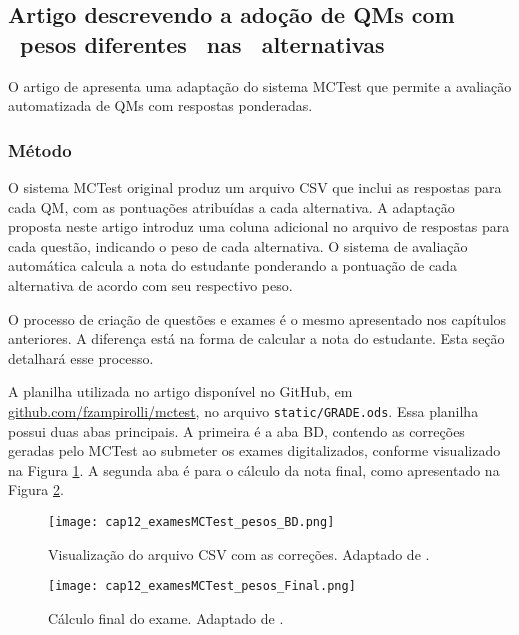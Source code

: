 \subsection{Artigo descrevendo a adoção de QMs com \ pesos diferentes \ nas \ alterna\-tivas}

O artigo de  apresenta uma adaptação do sistema MCTest que permite a avaliação automatizada de QMs com respostas ponderadas. 

\subsubsection{Método}

O sistema MCTest original produz um arquivo CSV que inclui as respostas para cada QM, com as pontuações atribuídas a cada alternativa. A adaptação proposta neste artigo introduz uma coluna adicional no arquivo de respostas para cada questão, indicando o peso de cada alternativa. O sistema de avaliação automática calcula a nota do estudante ponderando a pontuação de cada alternativa de acordo com seu respectivo peso.

O processo de criação de questões e exames é o mesmo apresentado nos capítulos anteriores. A diferença está na forma de calcular a nota do estudante. Esta seção detalhará esse processo.

A planilha utilizada no artigo disponível no GitHub, em \href{https://github.com/fzampirolli/mctest}{github.com/fzampirolli/mctest}, no arquivo \verb|static/GRADE.ods|.
%
Essa planilha possui duas abas principais. A primeira é a aba BD, contendo as correções geradas pelo MCTest ao submeter os exames digitalizados, conforme visualizado na Figura \ref{fig:cap12_examesMCTest_pesos_BD}. A segunda aba é para o cálculo da nota final, como apresentado na Figura \ref{fig:cap12_examesMCTest_pesos_Final}.

\begin{figure}[!ht]
\centering
  \texttt{[image: cap12\_examesMCTest\_pesos\_BD.png]}
  \caption{Visualização do arquivo CSV com as correções. Adaptado de .}
  \label{fig:cap12_examesMCTest_pesos_BD}
\end{figure}

\begin{figure}[!ht]
\centering
  \texttt{[image: cap12\_examesMCTest\_pesos\_Final.png]}
  \caption{Cálculo final do exame. Adaptado de .}
  \label{fig:cap12_examesMCTest_pesos_Final}
\end{figure}


